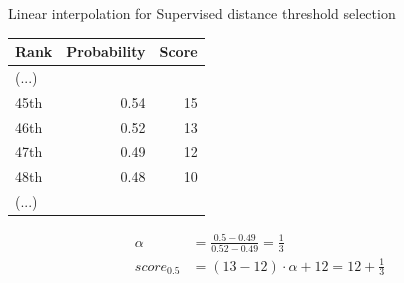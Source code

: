 \begin{example}
  \centering
  \caption{Linear interpolation for Supervised distance threshold selection}
  \label{ex:linear_interpolation}

  \begin{subexample}{\linewidth}
    \centering
    \begin{tabular}{l r r}
      \toprule
      Rank & Probability & Score \\
      \midrule
      (...) & &\\
      45th & 0.54 & 15 \\
      46th & 0.52 & 13 \\
      47th & 0.49 & 12 \\
      48th & 0.48 & 10 \\
      (...) & & \\
      \bottomrule
    \end{tabular}
  \end{subexample}

  \vspace{0.5cm}

  \begin{subexample}{\linewidth}
    \centering
    \begin{align}
        \alpha &= \frac{0.5 - 0.49}{0.52 - 0.49} = \frac{1}{3} \\
        \textit{score}_{0.5} &= (13 - 12) \cdot \alpha + 12 = 12 + \frac{1}{3}
    \end{align}
  \end{subexample}

\end{example}
